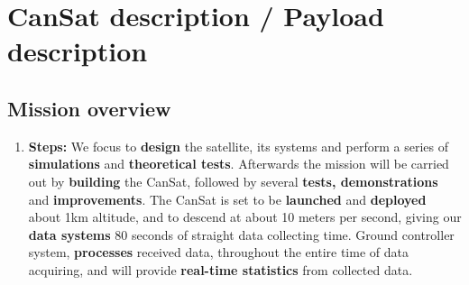 \documentclass[11pt]{article}
\begin{document}
\section{CanSat description / Payload description}

\subsection{Mission overview}
\begin{enumerate}
\item \textbf{Steps:} We focus to \textbf{design} the satellite, its systems and perform a series of \textbf{simulations} and \textbf{theoretical tests}. Afterwards the mission will be carried out by \textbf{building} the CanSat, followed by several \textbf{tests, demonstrations} and \textbf{improvements}. The CanSat is set to be \textbf{launched} and \textbf{deployed} about 1km altitude, and to descend at about 10 meters per second, giving our \textbf{data systems} 80 seconds of straight data collecting time. Ground controller system, \textbf{processes} received data, throughout the entire time of data acquiring, and will provide \textbf{real-time statistics} from collected data.
\vspace{0.25cm}
\end{enumerate}
\end{document}
